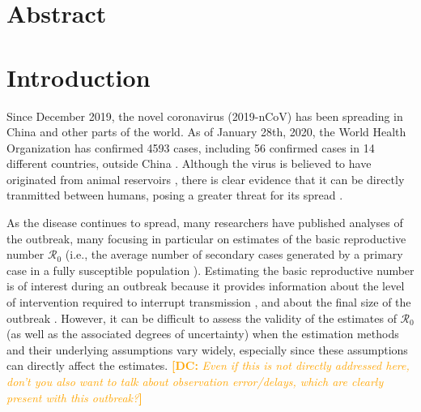 \documentclass[12pt]{article}
\date{\today}
\newcommand{\comment}[3]{\textcolor{#1}{\textbf{[#2: }\textsl{#3}\textbf{]}}}
\newcommand{\dc}[1]{\comment{Orange}{DC}{#1}}
\begin{document}
\begin{flushleft}{
	\Large
	\textbf{}
}

\bigskip

\end{flushleft}

\section*{Abstract}

\pagebreak

\section{Introduction}

Since December 2019, the novel coronavirus (2019-nCoV) has been spreading in China and other parts of the world.
As of January 28th, 2020, the World Health Organization has confirmed 4593 cases, including 56 confirmed cases in 14 different countries, outside China \citep{who28report}.
Although the virus is believed to have originated from animal reservoirs \citep{cdcncov}, 
there is clear evidence that it can be directly tranmitted between humans,
posing a greater threat for its spread \citep{huang2020clinical,who26report}.

As the disease continues to spread, many researchers have published analyses of the outbreak, many focusing in particular on estimates of the basic reproductive number $\mathcal R_0$ (i.e., the average number of secondary cases generated by a primary case in a fully susceptible population \citep{anderson1991infectious, diekmann1990definition}).
Estimating the basic reproductive number is of interest during an outbreak because it provides information about the level of intervention required to interrupt transmission \citep{anderson1991infectious}, and about the final size of the outbreak \citep{anderson1991infectious, ma2006generality}.
However, it can be difficult to assess the validity of the estimates of $\mathcal R_0$ (as well as the associated degrees of uncertainty) when the estimation methods and their underlying assumptions vary widely, especially since these assumptions can directly affect the estimates.
\dc{Even if this is not directly addressed here, don't you also want to talk about observation error/delays, which are clearly present with this outbreak?}
\end{document}
